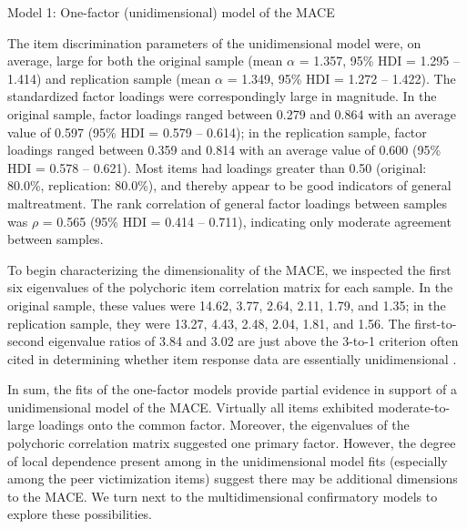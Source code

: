 \documentclass[letterpaper,man,natbib,floatsintext,longtable]{apa6}
\makeatletter
\renewcommand{\subsubsection}{\@startsection{subsubsection}{3}
  {\z@}%
  {\b@level@two@skip}{\e@level@two@skip}%
  {\normalfont\normalsize\bfseries}}
\makeatother
\begin{document}
\subsubsection{Model 1: One-factor (unidimensional) model of the MACE}

The item discrimination parameters of the unidimensional model were, on average, large for both the original sample (mean $\alpha$ = 1.357, 95\% HDI = 1.295 -- 1.414) and replication sample (mean $\alpha$ = 1.349, 95\% HDI = 1.272 -- 1.422). The standardized factor loadings were correspondingly large in magnitude. In the original sample, factor loadings ranged between 0.279 and 0.864 with an average value of 0.597 (95\% HDI = 0.579 -- 0.614); in the replication sample, factor loadings ranged between 0.359 and 0.814 with an average value of 0.600 (95\% HDI = 0.578 -- 0.621). Most items had loadings greater than 0.50 (original: 80.0\%, replication: 80.0\%), and thereby appear to be good indicators of general maltreatment. The rank correlation of general factor loadings between samples was $\rho$ = 0.565 (95\% HDI = 0.414 -- 0.711), indicating only moderate agreement between samples.

To begin characterizing the dimensionality of the MACE, we inspected the first six eigenvalues of the polychoric item correlation matrix for each sample. In the original sample, these values were 14.62, 3.77, 2.64, 2.11, 1.79, and 1.35; in the replication sample, they were 13.27, 4.43, 2.48, 2.04, 1.81, and 1.56. The first-to-second eigenvalue ratios of 3.84 and 3.02 are just above the 3-to-1 criterion often cited in determining whether item response data are essentially unidimensional \citep{embretson2013item}. 

In sum, the fits of the one-factor models provide partial evidence in support of a unidimensional model of the MACE. Virtually all items exhibited moderate-to-large loadings onto the common factor. Moreover, the eigenvalues of the polychoric correlation matrix suggested one primary factor. However, the degree of local dependence present among in the unidimensional model fits (especially among the peer victimization items) suggest there may be additional dimensions to the MACE. We turn next to the multidimensional confirmatory models to explore these possibilities.
\end{document}
